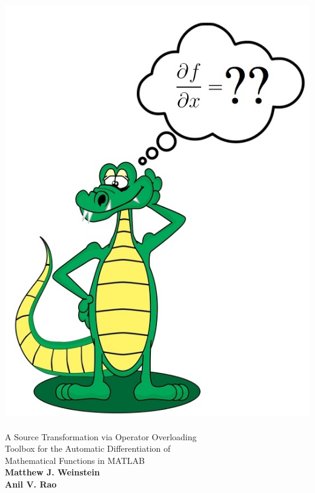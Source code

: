 \documentclass[10pt,pdftex]{article}
\date{}
\begin{document}
\begin{titlepage}
\begin{center}
\includegraphics[scale=.5]{derivgator_notitle.jpg}\\
\vspace{1 cm}
\\
\vspace{1 cm}
{\large A Source Transformation via Operator Overloading \\ Toolbox for the Automatic Differentiation of \\Mathematical Functions in MATLAB}\\
 \vspace{1 cm}
 {\bf \LARGE Matthew J. Weinstein\\ \vspace{10pt} Anil V. Rao}
\end{center}
\end{titlepage}
\end{document}
